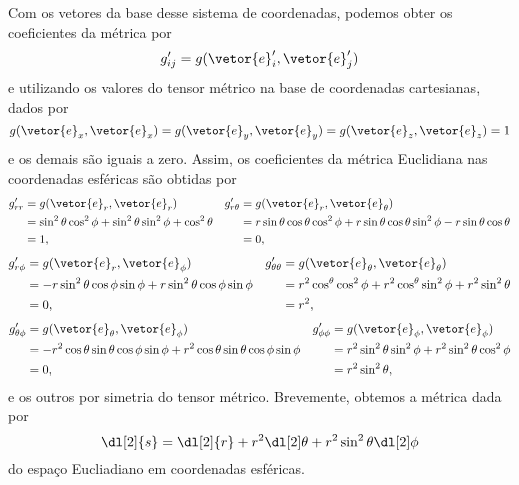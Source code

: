 Com os vetores da base desse sistema de coordenadas, podemos obter os coeficientes da métrica por
\begin{equation*}
    g'_{ij} = g(\vetor{e}_i', \vetor{e}_j')
\end{equation*}
e utilizando os valores do tensor métrico na base de coordenadas cartesianas, dados por
\begin{equation*}
    g(\vetor{e}_x, \vetor{e}_x) = g(\vetor{e}_y, \vetor{e}_y) = g(\vetor{e}_z, \vetor{e}_z) = 1
\end{equation*}
e os demais são iguais a zero. Assim, os coeficientes da métrica Euclidiana nas coordenadas esféricas são obtidas por
\begin{align*}
    g'_{rr} &= g(\vetor{e}_r, \vetor{e}_r) &
    g'_{r\theta} &= g(\vetor{e}_r, \vetor{e}_\theta) \\
                 &= \sin^2\theta\cos^2\phi + \sin^2\theta\sin^2\phi + \cos^2\theta&
                 &= r \sin\theta\cos\theta\cos^2\phi + r\sin\theta\cos\theta\sin^2\phi -r\sin\theta\cos\theta\\
                 &= 1, & &= 0,
\end{align*}
\begin{align*}
    g'_{r\phi} &= g(\vetor{e}_r, \vetor{e}_\phi) &
    g'_{\theta\theta} &= g(\vetor{e}_\theta, \vetor{e}_\theta)\\
                      &= -r\sin^2\theta\cos\phi\sin\phi + r\sin^2\theta\cos\phi\sin\phi&
                      &= r^2\cos^\theta\cos^2\phi + r^2\cos^\theta \sin^2\phi + r^2\sin^2\theta\\
                      &= 0, & &= r^2,
\end{align*}
\begin{align*}
    g'_{\theta\phi} &= g(\vetor{e}_\theta, \vetor{e}_\phi) &
    g'_{\phi\phi} &= g(\vetor{e}_\phi, \vetor{e}_\phi)\\
                  &= -r^2\cos\theta\sin\theta\cos\phi\sin\phi + r^2 \cos\theta\sin\theta\cos\phi\sin\phi&
                      &= r^2\sin^2\theta\sin^2\phi + r^2\sin^2\theta\cos^2\phi\\
                      &= 0, & &= r^2\sin^2\theta,
\end{align*}
e os outros por simetria do tensor métrico. Brevemente, obtemos a métrica dada por
\begin{equation*}
    \dl[2]{s} = \dl[2]{r} + r^2\dl[2]\theta + r^2 \sin^2 \theta \dl[2]\phi
\end{equation*}
do espaço Eucliadiano em coordenadas esféricas.

